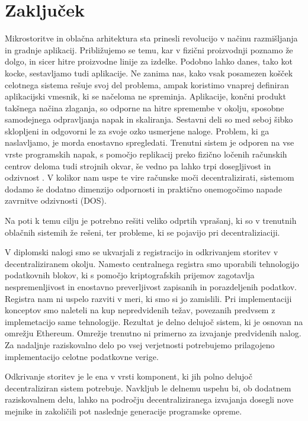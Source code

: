\documentclass[a4paper, 12pt]{book}
\begin{document}
\chapter{Zaključek}
\label{stroka}

Mikrostoritve in oblačna arhitektura sta prinesli revolucijo v načinu razmišljanja in gradnje aplikacij.
Približujemo se temu, kar v fizični proizvodnji poznamo že dolgo, in sicer hitre proizvodne linije za izdelke.
Podobno lahko danes, tako kot kocke, sestavljamo tudi aplikacije.
Ne zanima nas, kako vsak posamezen košček celotnega sistema rešuje svoj del problema, ampak koristimo vnaprej definiran aplikacijski vmesnik, ki se načeloma ne spreminja.
Aplikacije, končni produkt takšnega načina zlaganja, so odporne na hitre spremembe v okolju, sposobne samodejnega odpravljanja napak in skaliranja.
Sestavni deli so med seboj šibko sklopljeni in odgovorni le za svoje ozko usmerjene naloge.
Problem, ki ga naslavljamo, je morda enostavno spregledati.
Trenutni sistem je odporen na vse vrste programskih napak, s pomočjo replikacij preko fizično ločenih računskih centrov deloma tudi strojnih okvar, še vedno pa lahko trpi dosegljivost in odzivnost \cite{awsFail}.
V kolikor nam uspe te vire računske moči decentralizirati, sistemom dodamo še dodatno dimenzijo odpornosti in praktično onemogočimo napade zavrnitve odzivnosti (DOS).

Na poti k temu cilju je potrebno rešiti veliko odprtih vprašanj, ki so v trenutnih oblačnih sistemih že rešeni, ter probleme, ki se pojavijo pri decentraliziaciji.

V diplomski nalogi smo se ukvarjali z registracijo in odkrivanjem storitev v decentraliziranem okolju.
Namesto centralnega registra smo uporabili tehnologijo podatkovnih blokov, ki s pomočjo kriptografskih prijemov zagotavlja nespremenljivost in enostavno preverljivost zapisanih in porazdeljenih podatkov.
Registra nam ni uspelo razviti v meri, ki smo si jo zamislili.
Pri implementaciji konceptov smo naleteli na kup nepredvidenih težav, povezanih predvsem z implemetacijo same tehnologije.
Rezultat je delno delujoč sistem, ki je osnovan na omrežju Ethereum.
Omrežje trenutno ni primerno za izvajanje predvidenih nalog.
Za nadaljnje raziskovalno delo po vsej verjetnosti potrebujemo prilagojeno implementacijo celotne podatkovne verige.

Odkrivanje storitev je le ena v vrsti komponent, ki jih polno delujoč decentraliziran sistem potrebuje.
Navkljub le delnemu uspehu bi, ob dodatnem raziskovalnem delu, lahko na področju decentraliziranega izvajanja dosegli nove mejnike in zakoličili pot naslednje generacije programske opreme.



\newpage %
\ \\
\clearpage
{}


\end{document}
